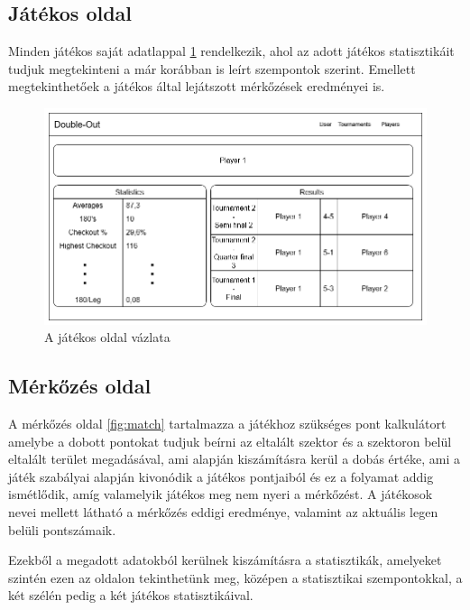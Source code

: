 \subsection{Játékos oldal}
Minden játékos saját adatlappal \ref{fig:player} rendelkezik, ahol az adott játékos statisztikáit tudjuk megtekinteni a már korábban is leírt szempontok szerint.
Emellett megtekinthetőek a játékos által lejátszott mérkőzések eredményei is.

\begin{figure}[h]
\centering
\includegraphics[scale=0.4]{images/PlayerPage.png}
\caption{A játékos oldal vázlata}
\label{fig:player}
\end{figure}

\subsection{Mérkőzés oldal}
A mérkőzés oldal \ref{fig:match} tartalmazza a játékhoz szükséges pont kalkulátort amelybe a dobott pontokat tudjuk beírni az eltalált szektor és a szektoron belül eltalált terület megadásával, ami alapján kiszámításra kerül a dobás értéke, ami a játék szabályai alapján kivonódik a játékos pontjaiból és ez a folyamat addig ismétlődik, amíg valamelyik játékos meg nem nyeri a mérkőzést. A játékosok nevei mellett látható a mérkőzés eddigi eredménye, valamint az aktuális legen belüli pontszámaik.

Ezekből a megadott adatokból kerülnek kiszámításra a statisztikák, amelyeket szintén ezen az oldalon tekinthetünk meg, középen a statisztikai szempontokkal, a két szélén pedig a két játékos statisztikáival.

